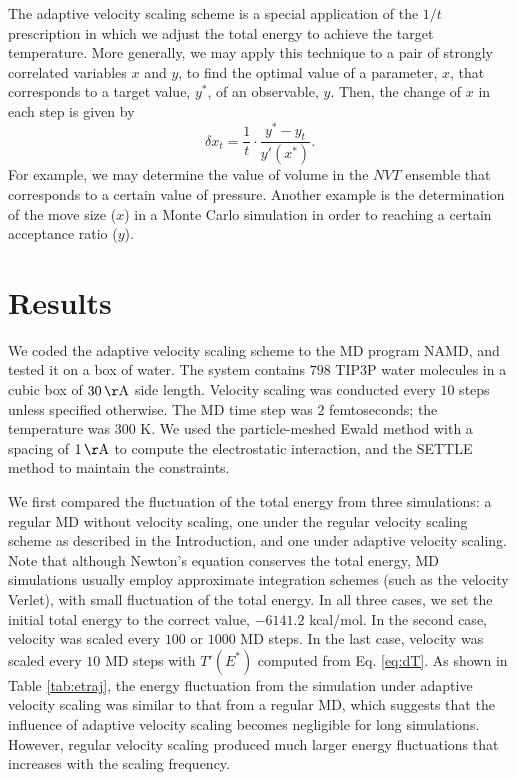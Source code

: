 \documentclass[reprint]{revtex4-1}
\begin{document}
The adaptive velocity scaling scheme
is a special application of the $1/t$ prescription
in which we adjust the total energy
to achieve the target temperature.
%
More generally, we may apply this technique
to a pair of strongly correlated variables $x$ and $y$,
to find the optimal value of a parameter, $x$,
that corresponds to a target value, $y^*$, of an observable, $y$.
%
Then, the change of $x$ in each step is given by
\begin{equation}
  \delta x_t = \frac 1 t
  \cdot
  \frac{ y^* - y_t }
       { y'(x^*) }
  .
  \label{eq:adjustxy}
\end{equation}
%
For example, we may determine the value of volume in the $NVT$ ensemble
that corresponds to a certain value of pressure.
%
Another example is the determination of the
move size ($x$)
in a Monte Carlo simulation
in order to reaching a certain acceptance ratio ($y$).




\section{Results}



We coded the adaptive velocity scaling scheme to
the MD program NAMD\cite{NAMD},
and tested it on a box of water.
%
The system contains
$798$ TIP3P water molecules\cite{jorgensen1983}
in a cubic box of $30 \, \mathrm{\AA}$ side length.
%
Velocity scaling was conducted every $10$ steps
unless specified otherwise.
%
The MD time step was $2$ femtoseconds;
the temperature was $300$ K.
%
We used the particle-meshed Ewald method\cite{essmann1995}
with a spacing of $1 \, \mathrm{\AA}$
to compute the electrostatic interaction,
and the SETTLE method\cite{miyamoto1992}
to maintain the constraints.


We first compared the fluctuation of the total energy
from three simulations:
%
a regular MD without velocity scaling,
one under the regular velocity scaling scheme as described in the Introduction,
and one under adaptive velocity scaling.
%
Note that although Newton's equation conserves the total energy,
MD simulations usually employ approximate integration schemes
(such as the velocity Verlet),
with
small fluctuation of the total energy.
%
In all three cases,
we set the initial total energy to the correct value, $-6141.2$ kcal/mol.
%
In the second case,
velocity was scaled every $100$ or $1000$ MD steps.
%
In the last case,
velocity was scaled every $10$ MD steps with
$T'(E^*)$ computed from Eq. \eqref{eq:dT}.
%
As shown in Table \ref{tab:etraj},
the energy fluctuation from the simulation under adaptive velocity scaling
was similar to that from a regular MD,
which suggests that the influence of adaptive velocity scaling
becomes negligible for long simulations.
%
However, regular velocity scaling
produced much larger energy fluctuations
that increases with the scaling frequency.
\end{document}

